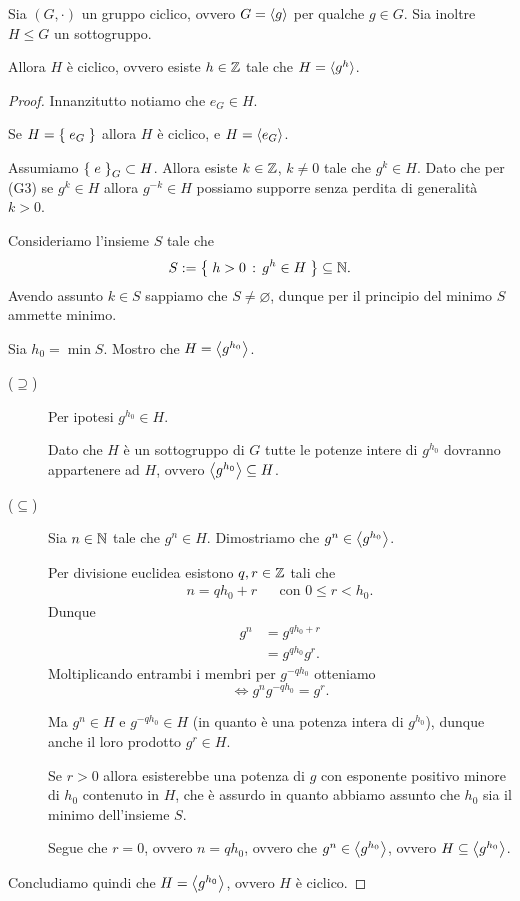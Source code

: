 \begin{theorem}
     \label{th:sottogr_ciclico}
    Sia $(G, \cdot)$ un gruppo ciclico, ovvero $G = \cycl{g}$ per qualche $g \in G$. Sia inoltre $H \leq G$ un sottogruppo.

    Allora $H$ è ciclico, ovvero esiste $h \in \Z$ tale che $H = \cycl{g^h}$.
\end{theorem}
\begin{proof}
    Innanzitutto notiamo che $e_G \in H$. 
    
    Se $H = \set{e_G}$ allora $H$ è ciclico, e $H = \cycl{e_G}$.

    Assumiamo $\set e_G \subset H$. Allora esiste $k \in \Z$, $k \neq 0$ tale che $g^k \in H$. 
    Dato che per (G3) se $g^k \in H$ allora $g^{-k} \in H$ possiamo supporre senza perdita di generalità $k > 0$.

    Consideriamo l'insieme $S$ tale che \[
        S \deq \set{h > 0 \suchthat g^h \in H} \subseteq \N.    
    \] Avendo assunto $k \in S$ sappiamo che $S \neq \varnothing$, dunque per il principio del minimo $S$ ammette minimo.

    Sia $h_0 = \min S$. Mostro che $H = \cycl*{g^{h_0}}$.
    \begin{description}
        \item[($\supseteq$)] Per ipotesi $g^{h_0} \in H$. 
        
        Dato che $H$ è un sottogruppo di $G$ tutte le potenze intere di $g^{h_0}$ dovranno appartenere ad $H$, ovvero $\cycl*{g^{h_0}} \subseteq H$.
        \item[($\subseteq$)] Sia $n \in \N$ tale che $g^n \in H$. Dimostriamo che $g^n \in \cycl*{g^{h_0}}$.
        
        Per divisione euclidea esistono $q, r \in \Z$ tali che \begin{align*}
            n = qh_0 + r &&\text{con } 0 \leq r < h_0.
        \end{align*}
        Dunque \begin{align*}
            g^n &= g^{qh_0 + r}\\
                &= g^{qh_0}g^r.
        \end{align*}
        Moltiplicando entrambi i membri per $g^{-qh_0}$ otteniamo \[
            \iff g^ng^{-qh_0} = g^r.
        \]

        Ma $g^n \in H$ e $g^{-qh_0} \in H$ (in quanto è una potenza intera di $g^{h_0}$), dunque anche il loro prodotto $g^r \in H$.

        Se $r > 0$ allora esisterebbe una potenza di $g$ con esponente positivo minore di $h_0$ contenuto in $H$, che è assurdo in quanto abbiamo assunto che $h_0$ sia il minimo dell'insieme $S$.
        
        Segue che $r = 0$, ovvero $n = qh_0$, ovvero che $g^n \in \cycl*{g^{h_0}}$, ovvero $H \subseteq \cycl*{g^{h_0}}$.
    \end{description}

    Concludiamo quindi che $H = \cycl*{g^{h_0}}$, ovvero $H$ è ciclico.
\end{proof}

